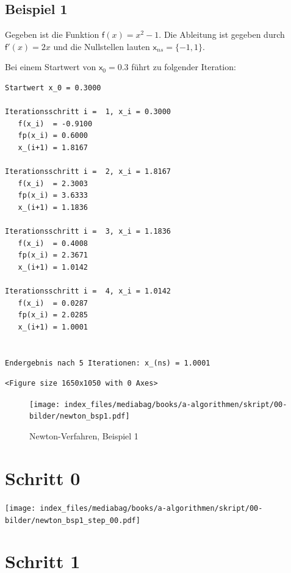 \documentclass[
  letterpaper,
  DIV=11,
  numbers=noendperiod]{scrreprt}
\begin{document}
\subsection{Beispiel 1}\label{beispiel-1}

Gegeben ist die Funktion \(\mathsf f(x) = x^2 - 1\). Die Ableitung ist
gegeben durch \(\mathsf f'(x) = 2x\) und die Nullstellen lauten
\(\mathsf x_{ns} = \{-1, 1\}\).

Bei einem Startwert von \(\mathsf x_0 = 0.3\) führt zu folgender
Iteration:

\begin{verbatim}
Startwert x_0 = 0.3000

Iterationsschritt i =  1, x_i = 0.3000
   f(x_i)  = -0.9100
   fp(x_i) = 0.6000
   x_(i+1) = 1.8167

Iterationsschritt i =  2, x_i = 1.8167
   f(x_i)  = 2.3003
   fp(x_i) = 3.6333
   x_(i+1) = 1.1836

Iterationsschritt i =  3, x_i = 1.1836
   f(x_i)  = 0.4008
   fp(x_i) = 2.3671
   x_(i+1) = 1.0142

Iterationsschritt i =  4, x_i = 1.0142
   f(x_i)  = 0.0287
   fp(x_i) = 2.0285
   x_(i+1) = 1.0001


Endergebnis nach 5 Iterationen: x_(ns) = 1.0001
\end{verbatim}

\begin{verbatim}
<Figure size 1650x1050 with 0 Axes>
\end{verbatim}

\begin{figure}[H]

{\centering \texttt{[image: index\_files/mediabag/books/a-algorithmen/skript/00-bilder/newton\_bsp1.pdf]}

}

\caption{Newton-Verfahren, Beispiel 1}

\end{figure}%

\section{Schritt 0}

\texttt{[image: index\_files/mediabag/books/a-algorithmen/skript/00-bilder/newton\_bsp1\_step\_00.pdf]}

\section{Schritt 1}
\end{document}
